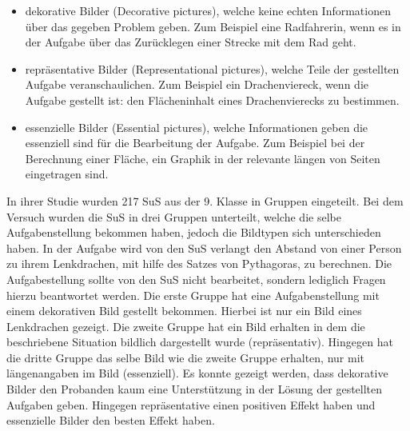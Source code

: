     \begin{itemize}
        \item dekorative Bilder (Decorative pictures), welche keine echten Informationen über das gegeben Problem geben. Zum Beispiel eine Radfahrerin, wenn es in der Aufgabe über das Zurücklegen einer Strecke mit dem Rad geht.
        \item repräsentative Bilder (Representational pictures), welche Teile der gestellten Aufgabe veranschaulichen. Zum Beispiel ein Drachenviereck, wenn die Aufgabe gestellt ist: den Flächeninhalt eines Drachenvierecks zu bestimmen. 
        \item essenzielle Bilder (Essential pictures), welche Informationen geben die essenziell sind für die Bearbeitung der Aufgabe. Zum Beispiel bei der Berechnung einer Fläche, ein Graphik in der relevante längen von Seiten eingetragen sind.
    \end{itemize}

In ihrer Studie wurden 217 SuS aus der 9. Klasse in Gruppen eingeteilt. Bei dem Versuch wurden die SuS in drei Gruppen unterteilt, welche die selbe Aufgabenstellung bekommen haben, jedoch die Bildtypen sich unterschieden haben. In der Aufgabe wird von den SuS verlangt den Abstand von einer Person zu ihrem Lenkdrachen, mit hilfe des Satzes von Pythagoras, zu berechnen. Die Aufgabestellung sollte von den SuS nicht bearbeitet, sondern lediglich Fragen hierzu beantwortet werden. 
Die erste Gruppe hat eine Aufgabenstellung mit einem dekorativen Bild gestellt bekommen. Hierbei ist nur ein Bild eines Lenkdrachen gezeigt.
Die zweite Gruppe hat ein Bild erhalten in dem die beschriebene Situation bildlich dargestellt wurde (repräsentativ). Hingegen hat die dritte Gruppe das selbe Bild wie die zweite Gruppe erhalten, nur mit längenangaben im Bild (essenziell).
Es konnte gezeigt werden, dass dekorative Bilder den Probanden kaum eine Unterstützung in der Lösung der gestellten Aufgaben geben. Hingegen repräsentative einen positiven Effekt haben und essenzielle Bilder den besten Effekt haben.%
